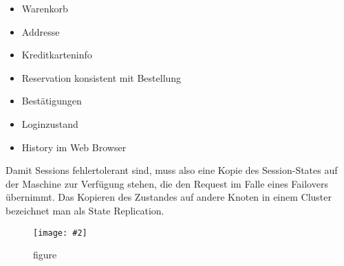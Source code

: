 \documentclass[a4paper,10pt]{scrreprt}
\newcommand{\pic}[2][figure]{\begin{figure}[h]
 \centering
 \texttt{[image: \#2]}
 \caption{#1}
\end{figure}
}
\begin{document}
\begin{description}
\begin{itemize}
	\item Warenkorb
	\item Addresse
	\item Kreditkarteninfo
	\item Reservation konsistent mit Bestellung
	\item Bestätigungen
	\item Loginzustand
	\item History im Web Browser
\end{itemize}

Damit Sessions fehlertolerant sind, muss also eine
Kopie des Session-States auf der Maschine zur
Verfügung stehen, die den Request im Falle eines
Failovers übernimmt. Das Kopieren des Zustandes auf
andere Knoten in einem Cluster bezeichnet man als
State Replication.
\pic{ft.png}
\end{description}
\end{document}

